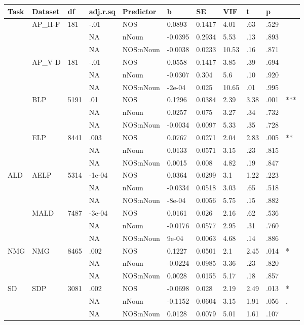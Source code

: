 \begin{table}[ht]
\centering
\begingroup\normalsize
\begin{tabular}{lllllllllll}
  \hline
Task & Dataset & df & adj.r.sq & Predictor & b & SE & VIF & t & p &  \\ 
  \hline
 & AP\_H-F & 181 & -.01 & NOS & 0.0893 & 0.1417 & 4.01 & .63 & .529 &   \\ 
   &  &  & NA & nNoun & -0.0395 & 0.2934 & 5.53 & .13 & .893 &   \\ 
   &  &  & NA & NOS:nNoun & -0.0038 & 0.0233 & 10.53 & .16 & .871 &   \\ 
   & AP\_V-D & 181 & -.01 & NOS & 0.0558 & 0.1417 & 3.85 & .39 & .694 &   \\ 
   &  &  & NA & nNoun & -0.0307 & 0.304 & 5.6 & .10 & .920 &   \\ 
   &  &  & NA & NOS:nNoun & -2e-04 & 0.025 & 10.65 & .01 & .995 &   \\ 
   & BLP & 5191 & .01 & NOS & 0.1296 & 0.0384 & 2.39 & 3.38 & .001 & *** \\ 
   &  &  & NA & nNoun & 0.0257 & 0.075 & 3.27 & .34 & .732 &   \\ 
   &  &  & NA & NOS:nNoun & -0.0034 & 0.0097 & 5.33 & .35 & .728 &   \\ 
   & ELP & 8441 & .003 & NOS & 0.0767 & 0.0271 & 2.04 & 2.83 & .005 & ** \\ 
   &  &  & NA & nNoun & 0.0133 & 0.0571 & 3.15 & .23 & .815 &   \\ 
   &  &  & NA & NOS:nNoun & 0.0015 & 0.008 & 4.82 & .19 & .847 &   \\ 
  ALD & AELP & 5314 & -1e-04 & NOS & 0.0364 & 0.0299 & 3.1 & 1.22 & .223 &   \\ 
   &  &  & NA & nNoun & -0.0334 & 0.0518 & 3.03 & .65 & .518 &   \\ 
   &  &  & NA & NOS:nNoun & -8e-04 & 0.0056 & 5.75 & .15 & .882 &   \\ 
   & MALD & 7487 & -3e-04 & NOS & 0.0161 & 0.026 & 2.16 & .62 & .536 &   \\ 
   &  &  & NA & nNoun & -0.0176 & 0.0577 & 2.95 & .31 & .760 &   \\ 
   &  &  & NA & NOS:nNoun & 9e-04 & 0.0063 & 4.68 & .14 & .886 &   \\ 
  NMG & NMG & 8465 & .002 & NOS & 0.1227 & 0.0501 & 2.1 & 2.45 & .014 & * \\ 
   &  &  & NA & nNoun & -0.0224 & 0.0985 & 3.36 & .23 & .820 &   \\ 
   &  &  & NA & NOS:nNoun & 0.0028 & 0.0155 & 5.17 & .18 & .857 &   \\ 
  SD & SDP & 3081 & .002 & NOS & -0.0698 & 0.028 & 2.19 & 2.49 & .013 & * \\ 
   &  &  & NA & nNoun & -0.1152 & 0.0604 & 3.15 & 1.91 & .056 & . \\ 
   &  &  & NA & NOS:nNoun & 0.0128 & 0.0079 & 5.01 & 1.61 & .107 &   \\ 
   \hline
\end{tabular}
\endgroup
\end{table}
